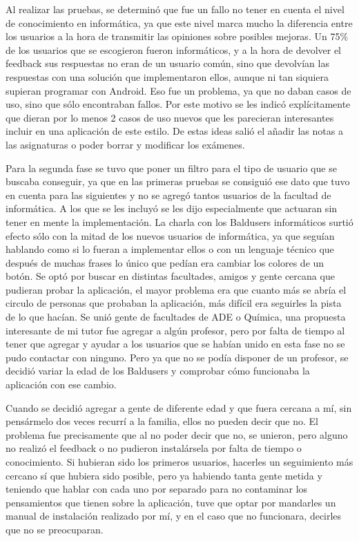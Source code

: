 Al realizar las pruebas, se determinó que fue un fallo no tener en cuenta el nivel de conocimiento en informática, ya que  este nivel marca mucho la diferencia entre los usuarios a la hora de transmitir las opiniones sobre posibles mejoras.
Un 75\% de los usuarios que se escogieron fueron informáticos, y a la hora de devolver el feedback sus respuestas no eran de un usuario común, sino que devolvían las respuestas con una solución que implementaron ellos, aunque ni tan siquiera supieran programar con Android.
Eso fue un problema, ya que no daban casos de uso, sino que sólo encontraban fallos. Por este motivo se les indicó explícitamente  que dieran por lo menos 2 casos de uso nuevos que les parecieran interesantes incluir en una aplicación de este estilo.
De estas ideas salió el añadir las notas a las asignaturas o poder borrar y modificar los exámenes.

Para la segunda fase se tuvo que poner un filtro para el tipo de usuario que se buscaba conseguir, ya que en las primeras pruebas se consiguió ese dato que tuvo en cuenta para las siguientes y no se agregó tantos usuarios de la facultad de informática. A los que se les incluyó se les dijo especialmente que actuaran sin tener en mente la implementación.
La charla con los Baldusers informáticos surtió efecto sólo con la mitad de los nuevos usuarios de informática, ya que seguían hablando como si lo fueran a implementar ellos o con un lenguaje técnico que después de muchas frases lo único que pedían era cambiar los colores de un botón. 
Se optó por buscar en distintas facultades, amigos y gente cercana que pudieran probar la aplicación, el mayor problema era que cuanto más se abría el circulo de personas que probaban la aplicación, más difícil era seguirles la pista de lo que hacían. 
Se unió gente de facultades de ADE o Química, una propuesta interesante de mi tutor fue agregar a algún profesor, pero por falta de tiempo al tener que agregar y ayudar a los usuarios que se habían unido en esta fase no se pudo contactar con ninguno.
Pero ya que no se podía disponer de un profesor, se decidió variar la edad de los Baldusers y comprobar cómo funcionaba la aplicación con ese cambio.

Cuando se decidió agregar a gente de diferente edad y que fuera cercana a mí, sin pensármelo dos veces recurrí a la familia, ellos no pueden decir que no.
El problema fue precisamente que al no poder decir que no, se unieron,  pero alguno no realizó el feedback o no pudieron instalársela por falta de tiempo o conocimiento.
Si hubieran sido los primeros usuarios, hacerles un seguimiento más cercano sí que hubiera sido posible, pero ya habiendo tanta gente metida y teniendo que hablar con cada uno por separado para no contaminar los pensamientos que tienen sobre la aplicación, tuve que optar por mandarles un manual de instalación realizado por mí, y en el caso que no funcionara, decirles que no se preocuparan.

